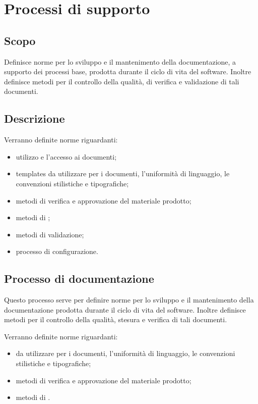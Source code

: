 \documentclass[12pt,a4paper]{article}
\begin{document}
\section{Processi di supporto}

\subsection{Scopo}
Definisce norme per lo sviluppo e il mantenimento della documentazione, a supporto dei processi base, prodotta durante il ciclo di vita del software. Inoltre definisce metodi per il controllo della qualità, di verifica e validazione di tali documenti.

\subsection{Descrizione}
Verranno definite norme riguardanti:
\begin{itemize}
	\item utilizzo e l'accesso ai documenti;
	\item templates da utilizzare per i documenti, l'uniformità di linguaggio, le convenzioni stilistiche e tipografiche;
	\item metodi di verifica e approvazione del materiale prodotto;
	\item metodi di ;
	\item metodi di validazione;
	\item processo di configurazione.
\end{itemize}

\subsection{Processo di documentazione}\label{Documentazione}
Questo processo serve per definire norme per lo sviluppo e il mantenimento della documentazione prodotta durante il ciclo di vita del software. Inoltre definisce metodi per il controllo della qualità, stesura e verifica di tali documenti.

Verranno definite norme riguardanti:
\begin{itemize}
	\item {} da utilizzare per i documenti, l'uniformità di linguaggio, le convenzioni stilistiche e tipografiche;
	\item metodi di verifica e approvazione del materiale prodotto;
	\item metodi di .
\end{itemize}
\end{document}
